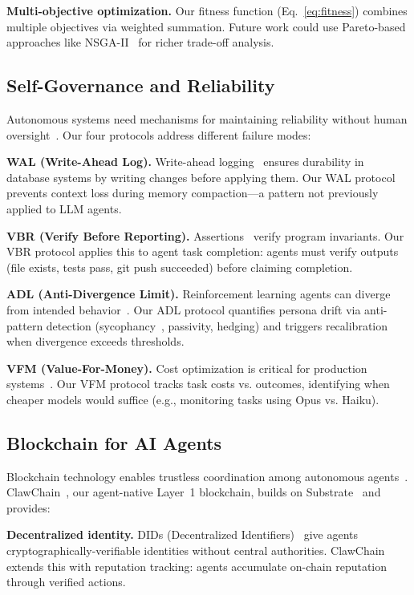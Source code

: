 \documentclass{article}
\begin{document}
\textbf{Multi-objective optimization.} Our fitness function (Eq.~\ref{eq:fitness}) combines multiple objectives via weighted summation. Future work could use Pareto-based approaches like NSGA-II~\cite{deb2002nsga2} for richer trade-off analysis.

\subsection{Self-Governance and Reliability}

Autonomous systems need mechanisms for maintaining reliability without human oversight~\cite{rushby1995critical}. Our four protocols address different failure modes:

\textbf{WAL (Write-Ahead Log).} Write-ahead logging~\cite{hewitt1976implementation} ensures durability in database systems by writing changes before applying them. Our WAL protocol prevents context loss during memory compaction---a pattern not previously applied to LLM agents.

\textbf{VBR (Verify Before Reporting).} Assertions~\cite{meyer1997object} verify program invariants. Our VBR protocol applies this to agent task completion: agents must verify outputs (file exists, tests pass, git push succeeded) before claiming completion.

\textbf{ADL (Anti-Divergence Limit).} Reinforcement learning agents can diverge from intended behavior~\cite{arnold2017constrained}. Our ADL protocol quantifies persona drift via anti-pattern detection (sycophancy~\cite{sharma2023sycophancy}, passivity, hedging) and triggers recalibration when divergence exceeds thresholds.

\textbf{VFM (Value-For-Money).} Cost optimization is critical for production systems~\cite{marr2023cost}. Our VFM protocol tracks task costs vs. outcomes, identifying when cheaper models would suffice (e.g., monitoring tasks using Opus vs. Haiku).

\subsection{Blockchain for AI Agents}

Blockchain technology enables trustless coordination among autonomous agents~\cite{swan2018blockchain}. ClawChain~\cite{clawchain}, our agent-native Layer~1 blockchain, builds on Substrate~\cite{wood2019polkadot} and provides:

\textbf{Decentralized identity.} DIDs (Decentralized Identifiers)~\cite{spencer2015decentralized} give agents cryptographically-verifiable identities without central authorities. ClawChain extends this with reputation tracking: agents accumulate on-chain reputation through verified actions.
\end{document}
